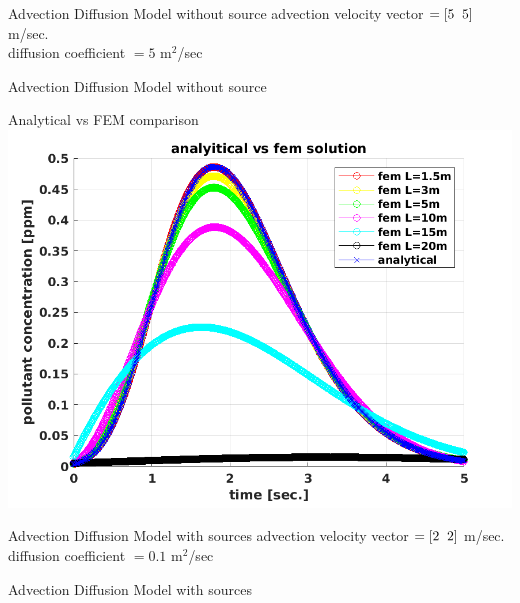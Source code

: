 \documentclass{beamer}
\begin{document}
\begin{frame}{Advection Diffusion Model without source}
advection velocity vector $=[5 \hspace{2mm} 5]$ m/sec.\\
diffusion coefficient $=5$ m$^2$/sec
\end{frame}
\begin{frame}{Advection Diffusion Model without source}
\end{frame}
\begin{frame}{Analytical vs FEM comparison}
\center
\includegraphics[scale=0.6]{pics/comparison.png}
\end{frame}
\begin{frame}{Advection Diffusion Model with sources}
advection velocity vector $=[2 \hspace{2mm} 2]$ m/sec.\\
diffusion coefficient $=0.1$ m$^2$/sec
\end{frame}
\begin{frame}{Advection Diffusion Model with sources}
\end{frame}
\end{document}
